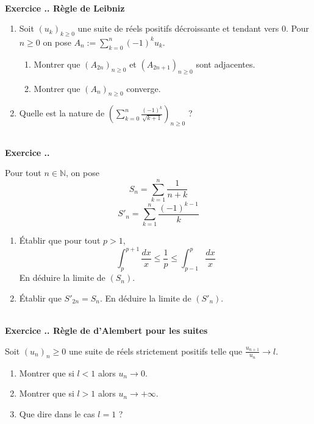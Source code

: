 \documentclass{article}
\newcommand{\mb}[1]{\mathbb{#1}}
\newcounter{exo}
\newcommand{\exercice}[1][\null]{\textbf{\\ Exercice \thesection.\theexo. #1} \addtocounter{exo}{1}}
\begin{document}
\exercice[Règle de Leibniz]

\begin{enumerate}

\item Soit $(u_k)_{k \ge 0}$ une suite de réels positifs décroissante et tendant vers $0$. Pour $n \ge 0$ on pose $\displaystyle A_n := \sum_{k=0}^n (-1)^{k} u_k$.


\begin{enumerate}

\item Montrer que $(A_{2n})_{n \ge 0}$ et $(A_{2n+1})_{n \ge 0}$ sont adjacentes.

\item Montrer que $(A_n)_{n \ge 0}$ converge.

\end{enumerate}

\item Quelle est la nature de $\displaystyle \left(\sum_{k=0}^n \frac{(-1)^{k}}{\sqrt{k+1}}\right)_{n \ge 0}$ ?

\end{enumerate}

\exercice

Pour tout $n \in \mb{N}$, on pose
\begin{equation*}
    S_{n} = \sum_{k = 1}^{n} \frac{1}{n + k}
\end{equation*}
\begin{equation*}
    S'_{n} = \sum_{k = 1}^{n} \frac{( - 1)^{k - 1}}{k}
\end{equation*}
\begin{enumerate}
    \item
    Établir que pour tout $p > 1$,
    \begin{equation*}
        \int_{p}^{p + 1} \frac{d x}{x} \leq \frac{1}{p} \leq \int_{p - 1}^{p} \frac{d x}{x}
    \end{equation*}
    En déduire la limite de $(S_{n})$.
    \item
    Établir que $S'_{2n} = S_{n}$. En déduire la limite de $(S'_{n})$.
\end{enumerate}

\exercice[Règle de d'Alembert pour les suites]

Soit $(u_n)_n \ge 0$ une suite de réels strictement positifs telle que $\frac{u_{n+1}}{u_n} \rightarrow l$.

\begin{enumerate}

\item Montrer que si $l<1$ alors $u_n \rightarrow 0$.

\item Montrer que si $l>1$ alors $u_n \rightarrow + \infty$.

\item Que dire dans le cas $l=1$ ?

\end{enumerate}
\end{document}
